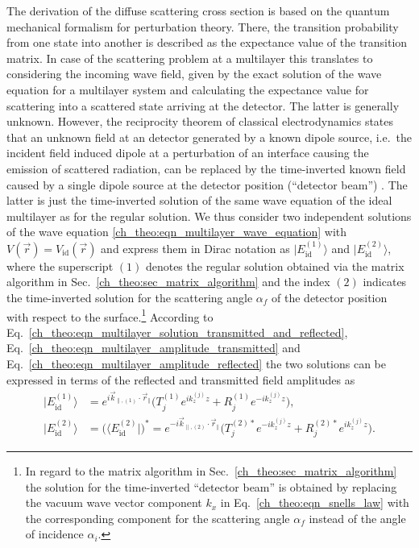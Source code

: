 The derivation of the diffuse scattering cross section is based on the quantum mechanical formalism for perturbation theory. There, the transition probability from one state into another is described as the expectance value of the transition matrix. In case of the scattering problem at a multilayer this translates to considering the incoming wave field, given by the exact solution of the wave equation for a multilayer system and calculating the expectance value for scattering into a scattered state arriving at the detector. The latter is generally unknown. However, the reciprocity theorem \cite{lorentz_theorem_1896, l._d._landau_electrodynamics_1960} of classical electrodynamics states that an unknown field at an detector generated by a known dipole source, i.e.~the incident field induced dipole at a perturbation of an interface causing the emission of scattered radiation, can be replaced by the time-inverted known field caused by a single dipole source at the detector position (``detector beam'') \cite{sinha_x-ray_1988, holy_nonspecular_1994, daillant_diffuse_2009}. The latter is just the time-inverted solution of the same wave equation of the ideal multilayer as for the regular solution. We thus consider two independent solutions of the wave equation \eqref{ch_theo:eqn_multilayer_wave_equation} with $V(\vec{r}) = V_\text{id}(\vec{r})$ and express them in Dirac notation \cite{dirac_new_1939} as $|E_{\text{id}}^{(1)}\rangle$ and $|E_{\text{id}}^{(2)}\rangle$, where the superscript $(1)$ denotes the regular solution obtained via the matrix algorithm in Sec.~\ref{ch_theo:sec_matrix_algorithm} and the index $(2)$ indicates the time-inverted solution for the scattering angle $\alpha_f$ of the detector position with respect to the surface.\footnote{In regard to the matrix algorithm in Sec.~\ref{ch_theo:sec_matrix_algorithm} the solution for the time-inverted ``detector beam'' is obtained by replacing the vacuum wave vector component $k_x$ in Eq.~\eqref{ch_theo:eqn_snells_law} with the corresponding component for the scattering angle $\alpha_f$ instead of the angle of incidence $\alpha_i$.} According to Eq.~\eqref{ch_theo:eqn_multilayer_solution_transmitted_and_reflected}, Eq.~\eqref{ch_theo:eqn_multilayer_amplitude_transmitted} and Eq.~\eqref{ch_theo:eqn_multilayer_amplitude_reflected} the two solutions can be expressed in terms of the reflected and transmitted field amplitudes as
\begin{align}
|E_{\text{id}}^{(1)}\rangle &= e^{i \vec{k}_{\parallel,(1)} \cdot \vec{r}_\parallel} \big(T_{j}^{(1)} e^{i k_z^{(j)} z} + R_{j}^{(1)} e^{-i k_z^{(j)} z}\big) \text{,} \label{ch_theo:eqn_regular_solution_ket}\\
|E_{\text{id}}^{(2)}\rangle &= \big(\langle E_{\text{id}}^{(2)}|\big)^* = e^{-i \vec{k}_{\parallel,(2)} \cdot \vec{r}_\parallel} \big(T_{j}^{(2)*} e^{-i k_z^{(j)} z} + R_{j}^{(2)*} e^{i k_z^{(j)} z}\big) \label{ch_theo:eqn_time_inverted_solution_ket} \text{.} 
\end{align}
